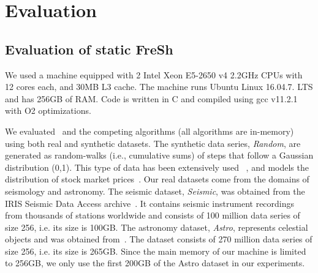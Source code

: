 
\chapter{Evaluation}
\label{chapter:Evaluation}

\section{Evaluation of static FreSh}

% 
We used a machine equipped with 2 Intel  Xeon E5-2650 v4 2.2GHz
CPUs with 12 cores each, and 30MB L3 cache. The machine runs
Ubuntu Linux 16.04.7. LTS and has 256GB of RAM. Code is written in C and
compiled using gcc v11.2.1 with O2 optimizations.

We evaluated \Fresh\ and the competing algorithms (all algorithms are in-memory) using both real and synthetic datasets.
The synthetic data series, \emph{Random}, are generated as random-walks (i.e., cumulative sums) of 
steps that follow a Gaussian distribution (0,1).
This type of data has been extensively used
~\cite{conf/sigmod/Faloutsos1994,isax2plus,conf/kdd/Zoumpatianos2015,DBLP:journals/vldb/ZoumpatianosLIP18,DBLP:journals/pvldb/EchihabiZPB18,DBLP:journals/pvldb/EchihabiZPB19}, 
and models the distribution of stock market prices~\cite{conf/sigmod/Faloutsos1994}.
Our real datasets come from the domains of seismology and astronomy.
The seismic dataset, \emph{Seismic}, was obtained from the IRIS Seismic Data Access
archive~\cite{url/data/seismic}. It contains seismic instrument recordings from
thousands of stations worldwide and consists of 100 million data series of size 256,
i.e. its size is 100GB. 
The astronomy dataset, \emph{Astro}, represents celestial objects and was obtained 
from~\cite{journal/aa/soldi2014}. The dataset consists of 270 million data series of
size 256, i.e. its size is 265GB.
% 
Since the main memory of our machine is limited to 256GB, we only use the first 200GB
of the Astro dataset in our experiments.

